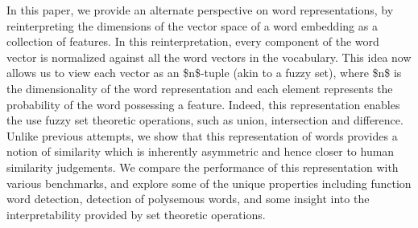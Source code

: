 In this paper, we provide an alternate perspective on word representations, by reinterpreting the dimensions of the vector space of a word embedding as a collection of features. In this reinterpretation, every component of the word vector is normalized against all the word vectors in the vocabulary. This idea now allows us to view each vector as an \$n\$-tuple (akin to a fuzzy set), where \$n\$ is the dimensionality of the word representation and each element represents the probability of the word possessing a feature. Indeed, this representation enables the use fuzzy set theoretic operations, such as union, intersection and difference. Unlike previous attempts, we show that this representation of words provides a notion of similarity which is inherently asymmetric and hence closer to human similarity judgements. We compare the performance of this representation with various benchmarks, and explore some of the unique properties including function word detection, detection of polysemous words, and some insight into the interpretability provided by set theoretic operations.
